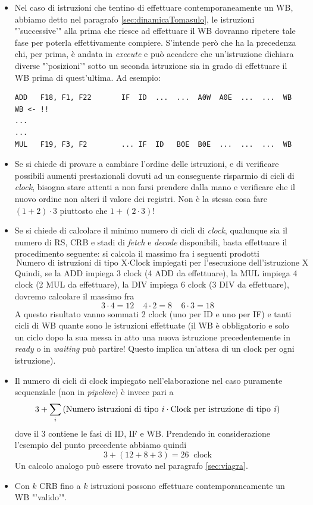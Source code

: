 \begin{itemize}
\item Nel caso di istruzioni che tentino di effettuare contemporaneamente un WB, abbiamo detto nel paragrafo \ref{sec:dinamicaTomasulo}, le istruzioni "'successive'" alla prima che riesce ad effettuare il WB dovranno ripetere tale fase per poterla effettivamente compiere. S'intende però che ha la precedenza chi, per prima, è andata in \textit{execute} e può accadere che un'istruzione dichiara diverse "'posizioni'" sotto un seconda istruzione sia in grado di effettuare il WB prima di quest'ultima. 
Ad esempio:
\begin{verbatim}
ADD   F18, F1, F22       IF  ID  ...  ...  A0W  A0E  ...  ...  WB   WB <- !!
...
...
MUL   F19, F3, F2        ... IF  ID   B0E  B0E  ...  ...  ...  WB  
\end{verbatim}
\item Se si chiede di provare a cambiare l'ordine delle istruzioni, e di verificare possibili aumenti prestazionali dovuti ad un conseguente risparmio di cicli di \textit{clock}, bisogna stare attenti a non farsi prendere dalla mano e verificare che il nuovo ordine non alteri il valore dei registri. Non è la stessa cosa fare $(1+2)\cdot 3$ piuttosto che $1 + (2\cdot 3)$!
\item Se si chiede di calcolare il minimo numero di cicli di \textit{clock}, qualunque sia il numero di RS, CRB e stadi di \textit{fetch} e \textit{decode} disponibili, basta effettuare il procedimento seguente: si calcola il massimo fra i seguenti prodotti
\[
\text{Numero di istruzioni di tipo X} \cdot \text{Clock impiegati per l'esecuzione dell'istruzione X}
\]
Quindi, se la ADD impiega 3 clock (4 ADD da effettuare), la MUL impiega 4 clock (2 MUL da effettuare), la DIV impiega 6 clock (3 DIV da effettuare), dovremo calcolare il massimo fra
\[
3\cdot 4 = 12  ~~~~~ 4\cdot 2 = 8  ~~~~~ 6\cdot 3 = 18 
\]
A questo risultato vanno sommati 2 clock (uno per ID e uno per IF) e tanti cicli di WB quante sono le istruzioni effettuate (il WB è obbligatorio e solo un ciclo dopo la sua messa in atto una nuova istruzione precedentemente in \textit{ready} o in \textit{waiting} può partire! Questo implica un'attesa di un clock per ogni istruzione).
\item Il numero di cicli di clock impiegato nell'elaborazione nel caso puramente sequenziale (non in \textit{pipeline}) è invece pari a 
\[
3 + \sum_i \left( \text{Numero istruzioni di tipo \textit{i}} \cdot \text{Clock per istruzione di tipo \textit{i}} \right)
\]
dove il 3 contiene le fasi di ID, IF e WB.
Prendendo in considerazione l'esempio del punto precedente abbiamo quindi
\[
3 + (12 + 8 + 3) = 26~ \text{ clock}
\]
Un calcolo analogo può essere trovato nel paragrafo \ref{sec:viagra}.
\item Con $k$ CRB fino a $k$ istruzioni possono effettuare contemporaneamente un WB "'valido'".

\end{itemize}
